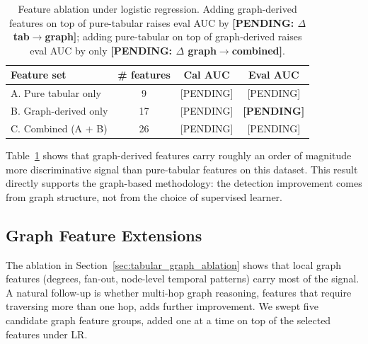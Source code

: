 \begin{table}[h]
\centering
\begin{tabular}{lccc}
\hline
Feature set & \# features & Cal AUC & Eval AUC \\
\hline
A. Pure tabular only    & 9  & [PENDING] & [PENDING] \\
B. Graph-derived only   & 17 & [PENDING] & \textbf{[PENDING]} \\
C. Combined (A $+$ B)  & 26 & [PENDING] & [PENDING] \\
\hline
\end{tabular}
\caption{Feature ablation under logistic regression. Adding graph-derived features on top of pure-tabular raises eval AUC by \textbf{[PENDING: $\Delta$ tab$\to$graph]}; adding pure-tabular on top of graph-derived raises eval AUC by only \textbf{[PENDING: $\Delta$ graph$\to$combined]}.}
\label{tab:tabular_graph}
\end{table}

Table~\ref{tab:tabular_graph} shows that graph-derived features carry roughly an order of magnitude more discriminative signal than pure-tabular features on this dataset. This result directly supports the graph-based methodology: the detection improvement comes from graph structure, not from the choice of supervised learner.


\subsection{Graph Feature Extensions}
\label{sec:graph_extensions}

The ablation in Section~\ref{sec:tabular_graph_ablation} shows that local graph features (degrees, fan-out, node-level temporal patterns) carry most of the signal. A natural follow-up is whether multi-hop graph reasoning, features that require traversing more than one hop, adds further improvement. We swept five candidate graph feature groups, added one at a time on top of the selected features under LR.

